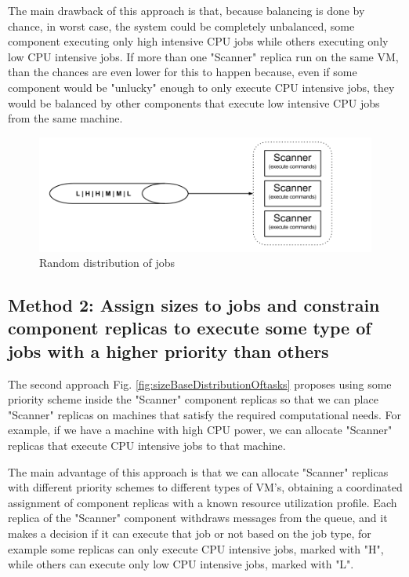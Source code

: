 The main drawback of this approach is that, because balancing is done by chance, in worst case, the system could be completely unbalanced, some component executing only high intensive CPU jobs while others executing only low CPU intensive jobs. If more than one "Scanner" replica run on the same VM, than the chances are even lower for this to happen because, even if some component would be "unlucky" enough to only execute CPU intensive jobs, they would be balanced by other components that execute low intensive CPU jobs from the same machine.

\begin{figure}[ht]
\centering
\includegraphics[width=\linewidth]{./img/1_NaturalLoadBalancing.png}
\caption{Random distribution of jobs}
\label{fig:randomDistributionsOfTasks}
\end{figure}

\subsection{Method 2: Assign sizes to jobs and constrain component replicas to execute some type of jobs with a higher priority than others}
\label{subsection:method2}
The second approach Fig. \ref{fig:sizeBaseDistributionOftasks} proposes using some priority scheme inside the "Scanner" component replicas so that we can place "Scanner" replicas on machines that satisfy the required computational needs. For example, if we have a machine with high CPU power, we can allocate "Scanner" replicas that execute CPU intensive jobs to that machine. 

The main advantage of this approach is that we can allocate "Scanner" replicas with different priority schemes to different types of VM's, obtaining a coordinated assignment of component replicas with a known resource utilization profile. Each replica of the "Scanner" component withdraws messages from the queue, and it makes a decision if it can execute that job or not based on the job type, for example some replicas can only execute CPU intensive jobs, marked with "H", while others can execute only low CPU intensive jobs, marked with "L". 

